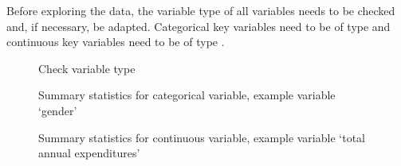 \documentclass[letterpaper,10pt,english]{sphinxmanual}
\begin{document}
Before exploring the data, the variable type of all variables needs to be checked and,
if necessary, be adapted. Categorical key variables need to be of type  and
continuous key variables need to be of type .

\begin{figure}[htbp]
\centering
\capstart

\noindent{}
\caption{Check variable type}\label{\detokenize{casestudies:fig132}}\label{\detokenize{casestudies:id18}}\end{figure}

\begin{figure}[htbp]
\centering
\capstart

\noindent{}
\caption{Summary statistics for categorical variable, example  variable ‘gender’}\label{\detokenize{casestudies:id1}}\label{\detokenize{casestudies:id19}}\end{figure}

\begin{figure}[htbp]
\centering
\capstart

\noindent{}
\caption{Summary statistics for continuous variable, example variable ‘total annual expenditures’}\label{\detokenize{casestudies:id2}}\label{\detokenize{casestudies:id20}}\end{figure}
\end{document}
